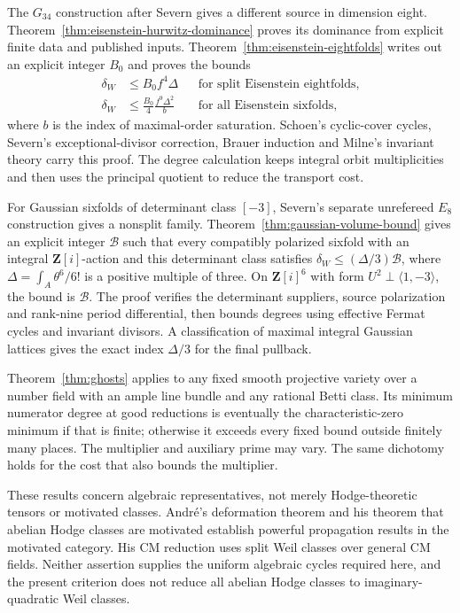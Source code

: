 \documentclass[11pt]{article}
\theoremstyle{definition}
\theoremstyle{remark}
\newcommand{\Z}{\mathbf Z}
\begin{document}
The $G_{34}$ construction after Severn gives a different source in dimension eight. Theorem~\ref{thm:eisenstein-hurwitz-dominance} proves its dominance from explicit finite data and published inputs. Theorem~\ref{thm:eisenstein-eightfolds} writes out an explicit integer $B_0$ and proves the bounds
\[
 \begin{aligned}
 \delta_W&\le B_0f^4\Delta
 &&\text{for split Eisenstein eightfolds},\\
 \delta_W&\le\frac{B_0}{4}\frac{f^9\Delta^2}{b}
 &&\text{for all Eisenstein sixfolds},
 \end{aligned}
\]
where $b$ is the index of maximal-order saturation. Schoen's cyclic-cover cycles, Severn's exceptional-divisor correction, Brauer induction and Milne's invariant theory carry this proof. The degree calculation keeps integral orbit multiplicities and then uses the principal quotient to reduce the transport cost.


For Gaussian sixfolds of determinant class $[-3]$, Severn's separate
unrefereed $E_8$ construction \cite{SevernGaussian} gives a nonsplit
family. Theorem~\ref{thm:gaussian-volume-bound} gives an explicit
integer $\mathcal B$ such that every compatibly polarized sixfold with
an integral $\Z[i]$-action and this determinant class satisfies
$\delta_W\le(\Delta/3)\mathcal B$, where
$\Delta=\int_A\theta^6/6!$ is a positive multiple of three.
On $\Z[i]^6$ with form $U^2\perp\langle1,-3\rangle$, the bound is
$\mathcal B$.  The proof verifies the determinant suppliers, source
polarization and rank-nine period differential, then bounds degrees
using effective Fermat cycles and invariant divisors.  A classification
of maximal integral Gaussian lattices gives the exact index
$\Delta/3$ for the final pullback.

Theorem~\ref{thm:ghosts} applies to any fixed smooth projective variety over a number field with an ample line bundle and any rational Betti class. Its minimum numerator degree at good reductions is eventually the characteristic-zero minimum if that is finite; otherwise it exceeds every fixed bound outside finitely many places. The multiplier and auxiliary prime may vary. The same dichotomy holds for the cost that also bounds the multiplier.

These results concern algebraic representatives, not merely Hodge-theoretic tensors or motivated classes. Andr\'e's deformation theorem and his theorem that abelian Hodge classes are motivated \cite[Theorems~0.5 and 0.6.2, pp.~8--9]{Andre96} establish powerful propagation results in the motivated category. His CM reduction \cite[Lemma~6.3.2, p.~32]{Andre96} uses split Weil classes over general CM fields. Neither assertion supplies the uniform algebraic cycles required here, and the present criterion does not reduce all abelian Hodge classes to imaginary-quadratic Weil classes.
\end{document}
